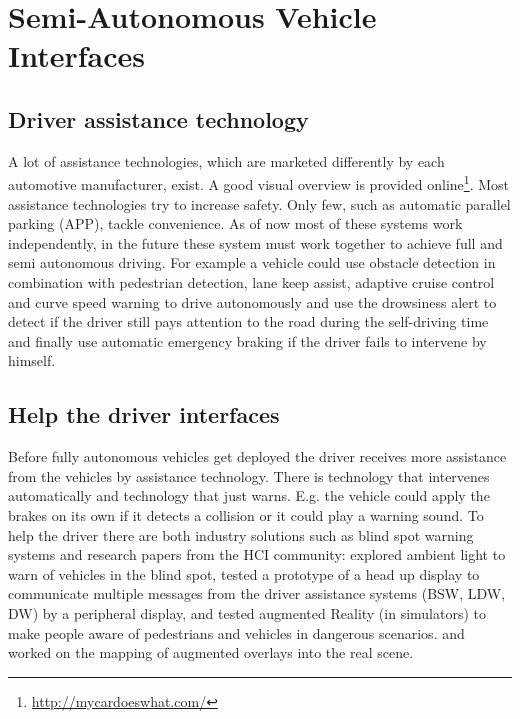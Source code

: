 \section{Semi-Autonomous Vehicle Interfaces}
\subsection{Driver assistance technology}
A lot of assistance technologies, which are marketed differently by each automotive manufacturer, exist. A good visual overview is provided online\footnote{\url{http://mycardoeswhat.com/}}. Most assistance technologies try to increase safety. Only few, such as automatic parallel parking (APP), tackle convenience. As of now most of these systems work independently, in the future these system must work together to achieve full and semi autonomous driving. For example a vehicle could use obstacle detection in combination with pedestrian detection, lane keep assist, adaptive cruise control and curve speed warning to drive autonomously and use the drowsiness alert to detect if the driver still pays attention to the road during the self-driving time and finally use automatic emergency braking if the driver fails to intervene by himself. 

\subsection{Help the driver interfaces}
Before fully autonomous vehicles get deployed the driver receives more assistance from the vehicles by assistance technology. There is technology that intervenes automatically and technology that just warns. E.g. the vehicle could apply the brakes on its own if it detects a collision or it could play a warning sound. To help the driver there are both industry solutions such as blind spot warning systems and research papers from the HCI community:  \cite{Loecken2015} explored ambient light to warn of vehicles in the blind spot, \cite{Langlois2013} tested a prototype of a head up display to communicate multiple messages from the driver assistance systems (BSW, LDW, DW) by a peripheral display, \cite{Kim} and \cite{Langlois2016} tested augmented Reality (in simulators) to make people aware of pedestrians and vehicles in dangerous scenarios. 
\cite{Larnaout2013} and \cite{Abdi} worked on the mapping of augmented overlays into the real scene. 

